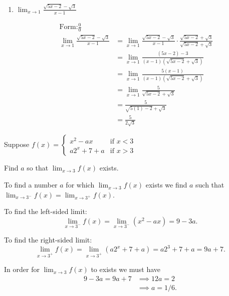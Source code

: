\documentclass[nooutcomes,handout]{ximera}
\begin{document}
\begin{problem}
\begin{enumerate}
	
	\item  $ \lim_{x \to 1} \frac{\sqrt{5x-2} - \sqrt{3}}{x-1} $
	\begin{freeResponse}
	\begin{align*}
	\text{Form:} \frac{0}{0}\\
	\lim_{x \to 1} \frac{\sqrt{5x-2} - \sqrt{3}}{x-1} &= \lim_{x \to 1} \frac{\sqrt{5x-2} - \sqrt{3}}{x-1} \cdot \frac{\sqrt{5x-2} + \sqrt{3}}{\sqrt{5x-2} + \sqrt{3}} \\
	&= \lim_{x \to 1} \frac{(5x-2)-3}{(x-1)(\sqrt{5x-2} + \sqrt{3})} \\
	&= \lim_{x \to 1} \frac{5(x-1)}{(x-1)(\sqrt{5x-2} + \sqrt{3})} \\
	&= \lim_{x \to 1} \frac{5}{\sqrt{5x-2} + \sqrt{3}} \\
	&=   \frac{5}{\sqrt{5(1)-2} + \sqrt{3}} \\
	&= \frac{5}{2 \sqrt{3}} 
	\end{align*}
	\end{freeResponse}
	\end{enumerate}
\end{problem}
	
	
	
	
			
			

\begin{problem}
Suppose
	$f(x) =   \left\{ \begin{array}{lr}
	x^2 - ax 	&	\text{if } x < 3	\\
	a2^x + 7 + a	&	\text{if } x > 3	\end{array} \right.  $
	
	Find $a$ so that $ \lim_{x \to 3} f(x)  $ exists.
	\begin{freeResponse}
	 To find a number $a$ for which $\lim_{x \to 3} f(x)$ exists we find $a$ such that $\lim_{x \to 3^-} f(x) = \lim_{x \to 3^+} f(x)$.

    To find the left-sided limit:
    \[
      \lim_{x \to 3^-} f(x) = \lim_{x \to 3^-} (x^2 - ax) = 9 - 3a.
    \]
  
    To find the right-sided limit:
    \[
      \lim_{x \to 3^+} f(x) = \lim_{x \to 3^+} (a2^x + 7 + a) = a2^3 + 7 + a = 9a + 7.
    \]

    In order for $\lim_{x \to 3} f(x)$ to exists we must have
    \begin{align*}
      9 - 3a = 9a + 7 &\implies 12a = 2\\
                      &\implies a = 1/6.
    \end{align*}
	\end{freeResponse}
\end{problem}
	
\end{document}
